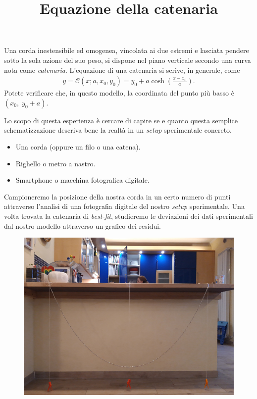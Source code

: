 \documentclass{lab1-article}
\title{Equazione della catenaria}
\begin{document}
\begin{article}

\maketitle

\secintro

Una corda inestensibile ed omogenea, vincolata ai due estremi e lasciata pendere
sotto la sola azione del suo peso, si dispone nel piano verticale secondo una
curva nota come \emph{catenaria}. L'equazione di una catenaria si scrive, in
generale, come
\begin{align}
  y = \mathcal{C}(x; a, x_0, y_0) = y_0 + a\cosh\left( \frac{x - x_0}{a} \right).
\end{align}
Potete verificare che, in questo modello, la coordinata del punto
pi\`u basso \`e $(x_0,\;y_0 + a)$.

Lo scopo di questa esperienza \`e cercare di capire se e quanto questa semplice
schematizzazione descriva bene la realt\`a in un \emph{setup} sperimentale
concreto.

\secmaterialsdad

\begin{itemize}
\item Una corda (oppure un filo o una catena).
\item Righello o metro a nastro.
\item Smartphone o macchina fotografica digitale.
\end{itemize}


\secmeasurements

Campioneremo la posizione della nostra corda in un certo numero di punti
attraverso l'analisi di una fotografia digitale del nostro \emph{setup}
sperimentale. Una volta trovata la catenaria di \emph{best-fit}, studieremo
le deviazioni dei dati sperimentali dal nostro modello attraverso un grafico
dei residui.

\begin{figure}[!hb]
  \includegraphics[width=\linewidth]{figures/catenaria}
\end{figure}


\end{article}
\end{document}
